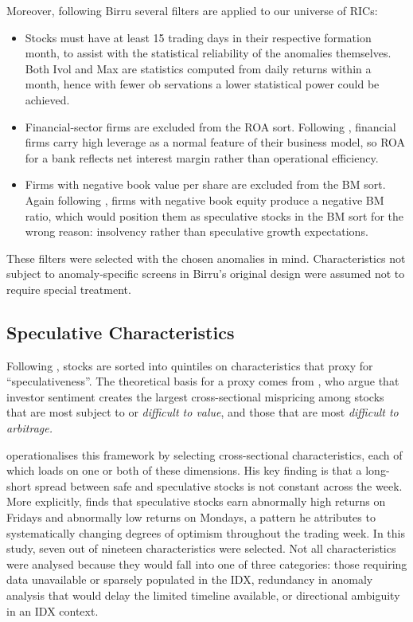 \documentclass[
	a4paper,
	10pt,
	twoside,
]{LTJournalArticle}
\begin{document}
Moreover, following Birru several filters are applied to our universe of RICs:
\begin{itemize}
	\item Stocks must have at least 15 trading days in their respective formation month, to assist with the statistical reliability of the anomalies themselves. Both Ivol and Max are statistics computed from daily returns within a month, hence with fewer ob servations a lower statistical power could be achieved.
	\item Financial-sector firms are excluded from the ROA sort. Following \citet{fama1993}, financial firms carry high leverage as a normal feature of their business model, so ROA for a bank reflects net interest margin rather than operational efficiency.
	\item Firms with negative book value per share are excluded from the BM sort. Again following \citet{fama1993}, firms with negative book equity produce a negative BM ratio, which would position them as speculative stocks in the BM sort for the wrong reason: insolvency rather than speculative growth expectations.
\end{itemize}

These filters were selected with the chosen anomalies in mind. Characteristics not subject to anomaly-specific screens in Birru's original design were assumed not to require special treatment.

\subsection{Speculative Characteristics}

Following \citet{birru2018}, stocks are sorted into quintiles on characteristics that proxy for ``speculativeness''. The theoretical basis for a proxy comes from \citet{baker2006}, who argue that investor sentiment creates the largest cross-sectional mispricing among stocks that are most subject to or \textit{difficult to value}, and those that are most \textit{difficult to arbitrage.} 

\citet{birru2018} operationalises this framework by selecting cross-sectional characteristics, each of which loads on one or both of these dimensions. His key finding is that a long-short spread between safe and speculative stocks is not constant across the week. More explicitly, \citet{birru2018} finds that speculative stocks earn abnormally high returns on Fridays and abnormally low returns on Mondays, a pattern he attributes to systematically changing degrees of optimism throughout the trading week. In this study, seven out of nineteen characteristics were selected. Not all characteristics were analysed because they would fall into one of three categories: those requiring data unavailable or sparsely populated in the IDX, redundancy in anomaly analysis that would delay the limited timeline available, or directional ambiguity in an IDX context.
\end{document}
